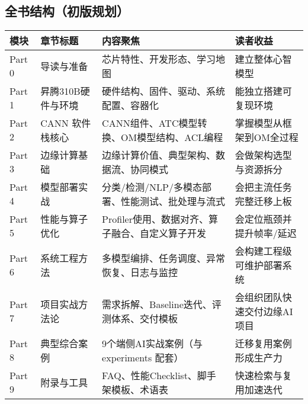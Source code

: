 \subsection*{全书结构（初版规划）}\label{全书结构初版规划}

\begin{longtable}[]{@{}
  >{\raggedright\arraybackslash}p{}
  >{\raggedright\arraybackslash}p{}
  >{\raggedright\arraybackslash}p{}
  >{\raggedright\arraybackslash}p{}@{}}
\toprule\noalign{}
\begin{minipage}[b]{\linewidth}\raggedright
模块
\end{minipage} & \begin{minipage}[b]{\linewidth}\raggedright
章节标题
\end{minipage} & \begin{minipage}[b]{\linewidth}\raggedright
内容聚焦
\end{minipage} & \begin{minipage}[b]{\linewidth}\raggedright
读者收益
\end{minipage} \\
\midrule\noalign{}
\endhead
\bottomrule\noalign{}
\endlastfoot
Part 0 & 导读与准备 & 芯片特性、开发形态、学习地图 & 建立整体心智模型 \\
Part 1 & 昇腾310B硬件与环境 & 硬件结构、固件、驱动、系统配置、容器化 &
能独立搭建可复现环境 \\
Part 2 & CANN 软件栈核心 & CANN组件、ATC模型转换、OM模型结构、ACL编程 &
掌握模型从框架到OM全过程 \\
Part 3 & 边缘计算基础 & 边缘计算价值、典型架构、数据流、协同模式 &
会做架构选型与资源拆分 \\
Part 4 & 模型部署实战 & 分类/检测/NLP/多模态部署、性能测试、批处理与流式
& 会把主流任务完整迁移上板 \\
Part 5 & 性能与算子优化 &
Profiler使用、数据对齐、算子融合、自定义算子开发 &
会定位瓶颈并提升帧率/延迟 \\
Part 6 & 系统工程方法 & 多模型编排、任务调度、异常恢复、日志与监控 &
会构建工程级可维护部署系统 \\
Part 7 & 项目实战方法论 & 需求拆解、Baseline迭代、评测体系、交付模板 &
会组织团队快速交付边缘AI项目 \\
Part 8 & 典型综合案例 & 9个端侧AI实战案例（与 experiments 配套） &
迁移复用案例形成生产力 \\
Part 9 & 附录与工具 & FAQ、性能Checklist、脚手架模板、术语表 &
快速检索与复用加速迭代 \\
\end{longtable}

